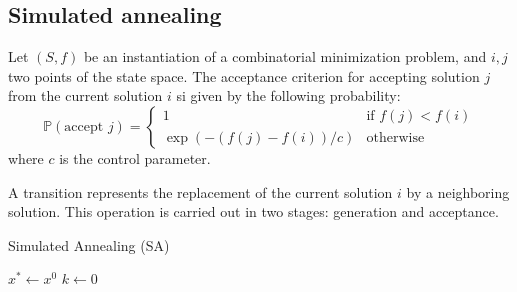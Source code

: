 \subsection{Simulated annealing}

\begin{defs}
	Let $(S,f)$ be an instantiation of a combinatorial minimization problem, and $i,j$ two points of the state space. The acceptance criterion for accepting solution $j$ from the current solution $i$ si given by the following probability:
	\[
	\mathbb{P}(\text{accept $j$})=
	\begin{cases}
		1 & \text{if $f(j)<f(i)$} \\
		\exp(-(f(j)-f(i))/c) & \text{otherwise}
	\end{cases}
	\]
	where $c$ is the control parameter.
\end{defs}

\begin{defs}[Transition]
	A transition represents the replacement of the current solution $i$ by a neighboring solution. This operation is carried out in two stages: generation and acceptance.
\end{defs}



\begin{algorithm}\caption{Simulated Annealing (SA)}\label{alg:sim-ann}
	$x^\ast\gets x^0$\;
	$k\gets0$\;
\end{algorithm}





































